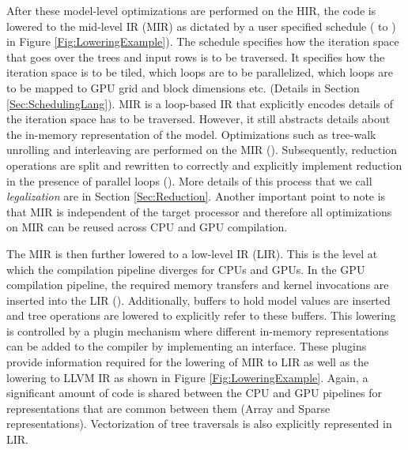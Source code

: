 After these model-level optimizations are performed on the HIR, the 
code is lowered to the mid-level IR (MIR) as dictated by a user specified schedule
( to ) in Figure \ref{Fig:LoweringExample}). The schedule specifies how
the iteration space that goes over the trees and input rows is to be traversed. 
It specifies how the iteration space is to be tiled, which loops are to be
parallelized, which loops are to be mapped to GPU grid and block dimensions etc.
(Details in Section \ref{Sec:SchedulingLang}). MIR is a loop-based IR that 
explicitly encodes details of the iteration space has to be traversed. However, 
it still abstracts details about the in-memory representation of the model. 
Optimizations such as tree-walk unrolling and interleaving are performed 
on the MIR (). Subsequently, reduction operations are split and rewritten 
to correctly and explicitly implement reduction in the presence of 
parallel loops (). More details of this process that we call 
\emph{legalization} are in Section \ref{Sec:Reduction}. Another important 
point to note is that MIR is independent of the target processor and therefore
all optimizations on MIR can be reused across CPU and GPU compilation.

The MIR is then further lowered to a low-level IR (LIR). This is the
level at which the compilation pipeline diverges for CPUs and GPUs. In 
the GPU compilation pipeline, the required memory transfers and kernel
invocations are inserted into the LIR (). Additionally, buffers 
to hold model values are inserted and tree operations are lowered to
explicitly refer to these buffers. This lowering is controlled by 
a plugin mechanism where different in-memory representations can 
be added to the compiler by implementing an interface. These plugins
provide information required for the lowering of MIR to LIR as well as 
the lowering to LLVM IR as shown in Figure \ref{Fig:LoweringExample}.
Again, a significant amount of code is shared between the
CPU and GPU pipelines for representations that are common between them
(Array and Sparse representations). Vectorization of tree traversals 
is also explicitly represented in LIR.

